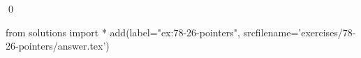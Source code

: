 
\begin{ex}
  \label{ex:78-26-pointers}
  
  \qed
\end{ex}
\begin{python0}
from solutions import *
add(label="ex:78-26-pointers",
    srcfilename='exercises/78-26-pointers/answer.tex')
\end{python0}
